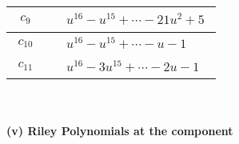 \documentclass[1p]{elsarticle_modified}
\theoremstyle{definition}
\begin{document}
\begin{tabular}{m{50pt}|m{274pt}}
\hline $$\begin{aligned}c_{9}\end{aligned}$$&$\begin{aligned}
&u^{16}- u^{15}+\cdots-21 u^2+5
\end{aligned}$\\
\hline $$\begin{aligned}c_{10}\end{aligned}$$&$\begin{aligned}
&u^{16}- u^{15}+\cdots- u-1
\end{aligned}$\\
\hline $$\begin{aligned}c_{11}\end{aligned}$$&$\begin{aligned}
&u^{16}-3 u^{15}+\cdots-2 u-1
\end{aligned}$\\
\hline
\end{tabular}\\~\\
\newpage\renewcommand{\arraystretch}{1}
\flushleft \textbf{(v) Riley Polynomials at the component}\newline \\
\end{document}
